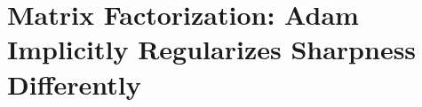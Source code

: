 


\section{Matrix Factorization: Adam Implicitly Regularizes Sharpness Differently}\label{sec:matrix}

